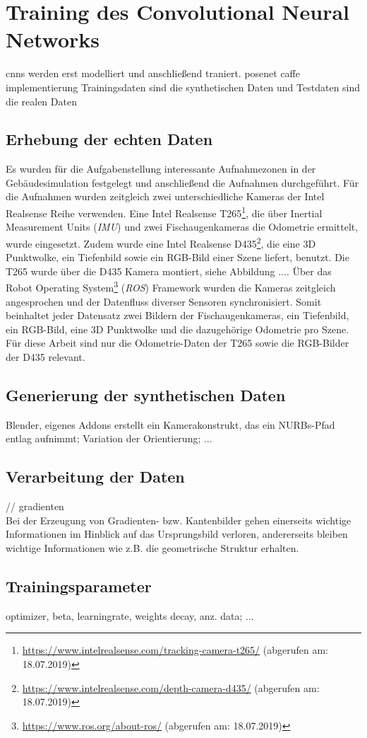 
\section{Training des Convolutional Neural Networks}
cnns werden erst modelliert und anschließend traniert.
posenet caffe implementierung
Trainingsdaten sind die synthetischen Daten und Testdaten sind die realen Daten

\subsection{Erhebung der echten Daten}
Es wurden für die Aufgabenstellung interessante Aufnahmezonen in der Gebäudesimulation festgelegt und anschließend die Aufnahmen durchgeführt. Für die Aufnahmen wurden zeitgleich zwei unterschiedliche Kameras der Intel Realsense Reihe verwenden. Eine Intel Realsense T265\footnote{\url{https://www.intelrealsense.com/tracking-camera-t265/} (abgerufen am: 18.07.2019)}, die über Inertial Measurement Units (\textit{IMU}) und zwei Fischaugenkameras die Odometrie ermittelt, wurde eingesetzt. Zudem wurde eine Intel Realsense D435\footnote{ \url{https://www.intelrealsense.com/depth-camera-d435/} (abgerufen am: 18.07.2019)}, die eine 3D Punktwolke, ein Tiefenbild sowie ein RGB-Bild einer Szene liefert, benutzt. Die T265 wurde über die D435 Kamera montiert, siehe Abbildung .... Über das Robot Operating System\footnote{\url{https://www.ros.org/about-ros/} (abgerufen am: 18.07.2019)} (\textit{ROS}) Framework wurden die Kameras zeitgleich angesprochen und der Datenfluss diverser Sensoren synchronisiert. Somit beinhaltet jeder Datensatz zwei Bildern der Fischaugenkameras, ein Tiefenbild, ein RGB-Bild, eine 3D Punktwolke und die dazugehörige Odometrie pro Szene. Für diese Arbeit sind nur die Odometrie-Daten der T265 sowie die RGB-Bilder der D435 relevant.




\subsection{Generierung der synthetischen Daten}
Blender,
eigenes Addons erstellt ein Kamerakonstrukt, das ein NURBs-Pfad entlag aufnimmt; Variation der Orientierung; ...

\subsection{Verarbeitung der Daten}
// gradienten\\
Bei der Erzeugung von Gradienten- bzw. Kantenbilder gehen einerseits wichtige Informationen im Hinblick auf das Ursprungsbild verloren, andererseits bleiben wichtige Informationen wie z.B. die geometrische Struktur erhalten.

\subsection{Trainingsparameter}
optimizer, beta,
learningrate,
weights decay, anz. data; ...